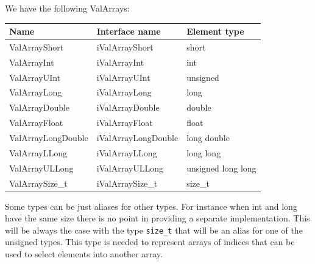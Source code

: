 \documentclass[12pt,a4paper]{memoir} %
\begin{document}
{{We have the following ValArrays:
\begin{center}
\begin{tabular}{l|l|l}
\hline
\textbf{Name}&\textbf{Interface name}&\textbf{Element type}\\ \hline
ValArrayShort&iValArrayShort&short\\ \hline
ValArrayInt&iValArrayInt&int\\ \hline
ValArrayUInt&iValArrayUInt&unsigned\\ \hline
ValArrayLong&iValArrayLong&long\\ \hline
ValArrayDouble&iValArrayDouble&double\\ \hline
ValArrayFloat&iValArrayFloat&float\\ \hline
ValArrayLongDouble&iValArrayLongDouble&long double\\ \hline
ValArrayLLong&iValArrayLLong&long long\\ \hline
ValArrayULLong&iValArrayULLong&unsigned long long\\ \hline
ValArraySize\_t&iValArraySize\_t&size\_t\\ \hline
\end{tabular}
\end{center}
Some types can be just aliases for other types. For instance when int and long have the same size there is no point in providing a separate
implementation. This will be always the case with the type \verb,size_t, that will be an alias for one of the unsigned types. This type is needed to
represent arrays of indices that can be used to select elements into another array.

}}
\end{document}
